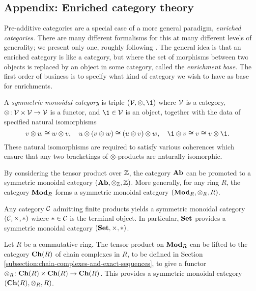 \subsection{Appendix: Enriched category theory}
Pre-additive categories are a special case of a more general paradigm, \emph{enriched categories.} There are many different formalisms for this at many different levels
of generality; we present only one, roughly following \cite{riehl-categorical-homotopy-theory}. The general idea is that an enriched category is like a category, but where the set of morphisms between two objects is replaced by
an object in some category, called the \emph{enrichment base.} The first order of business is to specify what kind of category we wish to have as base for enrichments.
\begin{definition}
	A \emph{symmetric monoidal category} is triple \((\calV,\otimes,\1)\) where \(\mathcal{V}\) is a category, \(\otimes\!:\mathcal{V}\times\mathcal{V}\to\mathcal{V}\) is a functor,
	and \(\1\in\calV\) is an object, together with the data of specified natural isomorphisms
	\[ v\otimes w \cong w\otimes v,\quad u\otimes(v\otimes w)\cong (u\otimes v)\otimes w,\quad \1\otimes v\cong v \cong v\otimes \1. \]
	These natural isomorphisms are required to satisfy various coherences which ensure that any two bracketings of \(\otimes\)-products are naturally isomorphic.
\end{definition}
\begin{example}
	By considering the tensor product over \(\mathbb{Z}\), the category \(\mathbf{Ab}\) can be promoted to a symmetric monoidal category \((\mathbf{Ab},\otimes_{\mathbb{Z}},\mathbb{Z})\). More generally, for
	any ring \(R\), the category \(\mathbf{Mod}_R\) forms a symmetric monoidal category \((\mathbf{Mod}_R,\otimes_R,R)\).
\end{example}
\begin{example}
	Any category \(\mathcal{C}\) admitting finite products yields a symmetric monoidal category \((\mathcal{C},\times,*)\) where \(*\in\mathcal{C}\) is the terminal object. In particular,
	\(\mathbf{Set}\) provides a symmetric monoidal category \((\mathbf{Set},\times,*)\).
\end{example}
\begin{example}
	Let \(R\) be a commutative ring. The tensor product on \(\mathbf{Mod}_R\) can be lifted to the category \(\mathbf{Ch}(R)\) of chain complexes in \(R\), to be defined in Section \ref{subsection:chain-complexes-and-exact-sequences},
	to give a functor \(\otimes_R\!:\mathbf{Ch}(R)\times\mathbf{Ch}(R)\to\mathbf{Ch}(R)\). This provides a symmetric monoidal category \((\mathbf{Ch}(R),\otimes_R,R)\).
\end{example}
